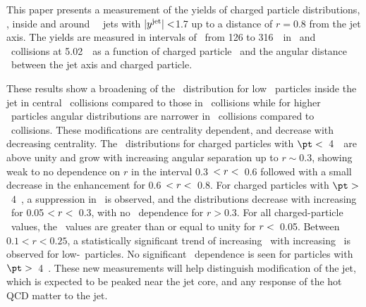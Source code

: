 
This paper presents a measurement of the yields of charged particle distributions, \Dptr, inside and around \RFour\ \antikt\ jets with $|\mbox{$y^{\mathrm{jet}}$}| <$1.7 up to a distance of $r = 0.8$ from the jet axis. The yields are measured in intervals of \ptjet\ from 126 to 316~\GeV\ in \PbPb\ and \pp\ collisions at 5.02~\TeV\ as a function of charged particle \pt\ and the angular distance \rvar\ between the jet axis and charged particle.


These results show a broadening of the \Dptr\ distribution for low \pt\ particles inside the jet
in central \pbpb\ collisions compared to those in \pp\ collisions while for higher \pt\ particles
angular distributions are narrower in \pbpb\ collisions compared to \pp\ collisions.
These modifications are centrality dependent, and decrease with decreasing centrality. 
The \RDptr\ distributions for charged particles with $\pt <$~4~\GeV\ 
are above unity and 
grow with increasing angular separation up to $r \sim0.3$, showing weak to no dependence on $r$ in the interval 0.3~$< \mbox{$r$} <$~0.6 followed with a small decrease in the enhancement for 0.6~$< \mbox{$r$} <$~0.8.
For charged particles with $\pt >$~4~\GeV, a suppression in \RDptr\ is observed, and the 
distributions decrease with increasing
\rvar\ for 0.05 $ < \mbox{$r$} < $~0.3, with no \rvar\ dependence for $r>0.3$. 
For all charged-particle \pt\ values, the \RDptr\ values are greater than or equal to unity for
$\mbox{$r$} <$~0.05.
Between $0.1 < r < 0.25$, a statistically significant trend of increasing \RDptr\ with increasing \ptjet\ is observed for low-\pt\ particles. No significant \ptjet\ dependence is seen for particles  with $\pt >$~4~\GeV.
These new measurements will help distinguish modification of the jet, which is expected to be peaked near the jet core, and 
any response of the hot QCD matter to the jet.



